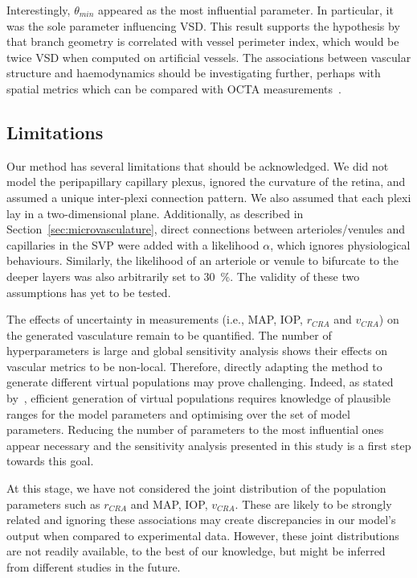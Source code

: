 \documentclass[11pt,]{article}
\begin{document}
Interestingly, $\theta_{min}$ appeared as the most influential parameter.
In particular, it was the sole parameter influencing VSD.
This result supports the hypothesis by~\cite{Yao_2020} that branch geometry is correlated with vessel perimeter index, which would be twice VSD when computed on artificial vessels.
The associations between vascular structure and haemodynamics should be investigating further, perhaps with spatial metrics which can be compared with OCTA measurements~\cite{Yao_2020}.

\subsection{Limitations}\label{sec:disc-limitations}

Our method has several limitations that should be acknowledged.
We did not model the peripapillary capillary plexus, ignored the curvature of the retina, and assumed a unique inter-plexi connection pattern.
We also assumed that each plexi lay in a two-dimensional plane.
Additionally, as described in Section~\ref{sec:microvasculature}, direct connections between arterioles/venules and capillaries in the SVP were added with a likelihood $\alpha$, which ignores physiological behaviours.
Similarly, the likelihood of an arteriole or venule to bifurcate to the deeper layers was also arbitrarily set to \SI{30}{\percent}.
The validity of these two assumptions has yet to be tested.

The effects of uncertainty in measurements (i.e., MAP, IOP, $r_{CRA}$ and $v_{CRA}$) on the generated vasculature remain to be quantified.
The number of hyperparameters is large and global sensitivity analysis shows their effects on vascular metrics to be non-local.
Therefore, directly adapting the method to generate different virtual populations may prove challenging.
Indeed, as stated by~\cite{Allen_2016}, efficient generation of virtual populations requires knowledge of plausible ranges for the model parameters and optimising over the set of model parameters.
Reducing the number of parameters to the most influential ones appear necessary and the sensitivity analysis presented in this study is a first step towards this goal.

At this stage, we have not considered the joint distribution of the population parameters such as $r_{CRA}$ and MAP, IOP, $v_{CRA}$.
These are likely to be strongly related and ignoring these associations may create discrepancies in our model's output when compared to experimental data.
However, these joint distributions are not readily available, to the best of our knowledge, but might be inferred from different studies in the future.
\end{document}
